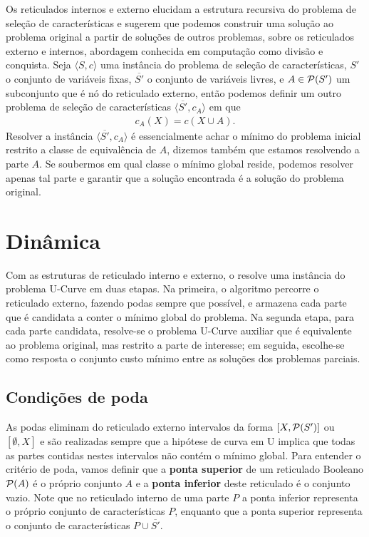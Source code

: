 Os reticulados internos e externo elucidam a estrutura recursiva do 
problema de seleção de características e sugerem que podemos construir 
uma solução ao problema original a partir de soluções de outros 
problemas, sobre os reticulados externo e internos, abordagem conhecida
em computação como divisão e conquista. Seja $\langle S, c \rangle$ uma 
instância do problema de seleção de características, $S'$ o conjunto de 
variáveis fixas, $\overline{S'}$ o conjunto de variáveis livres, e 
$A \in \mathcal{P} (S')$ um subconjunto que é nó do reticulado externo, 
então podemos definir um outro problema de seleção de características 
$\langle \overline{S'}, c_{A} \rangle$ em que 
\begin{align*}
    c_{A} (X) = c (X \cup A).
\end{align*}
Resolver a instância $\langle \overline{S'}, c_{A} \rangle$ é 
essencialmente achar o mínimo do problema inicial restrito a classe de
equivalência de $A$, dizemos também que estamos resolvendo a parte $A$. 
Se soubermos em qual classe o mínimo global reside, podemos resolver 
apenas tal parte e garantir que a solução encontrada é a solução do 
problema original.


\section{Dinâmica}
Com as estruturas de reticulado interno e externo, o  
resolve uma instância do problema U-Curve em duas etapas. Na primeira, o
algoritmo percorre o reticulado externo, fazendo podas sempre que 
possível, e armazena cada parte que é candidata a conter o mínimo global
do problema. Na segunda etapa, para cada parte candidata, resolve-se o
problema U-Curve auxiliar que é equivalente ao problema original, mas 
restrito a parte de interesse; em seguida, escolhe-se como resposta o 
conjunto custo mínimo entre as soluções dos problemas parciais.


\subsection{Condições de poda}
As podas eliminam do reticulado externo intervalos da forma 
$[X, \mathcal{P}(S')]$ ou $[\emptyset, X]$ e são realizadas sempre que a 
hipótese de curva em U implica que todas as partes contidas nestes 
intervalos não contém o mínimo global. Para entender o critério de poda,
vamos definir que a {\bf ponta superior} de um reticulado Booleano 
$\mathcal{P} (A)$ é o próprio conjunto $A$ e a {\bf ponta inferior} deste
reticulado é o conjunto vazio. Note que no reticulado interno de uma
parte $P$ a ponta inferior representa o próprio conjunto de 
características $P$, enquanto que a ponta superior representa o conjunto
de características $P \cup \overline{S'}$.

